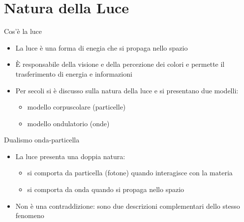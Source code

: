 \section{Natura della Luce}

\begin{frame}{Cos'è la luce}
    \begin{itemize}
        \item La luce è una forma di enegia che si propaga nello spazio
        \item È responsabile della visione e della percezione dei colori e permette il trasferimento di energia e informazioni
        \item Per secoli si è discusso sulla natura della luce e si presentano due modelli:
        \begin{itemize}
            \item modello corpuscolare (particelle)
            \item modello ondulatorio (onde)
        \end{itemize}
    \end{itemize}
\end{frame}

\newcommand{\currentlink}{} %


\begin{frame}{Dualismo onda-particella}
    \begin{itemize}
        \item La luce presenta una doppia natura:
        \begin{itemize}
            \item si comporta da particella (fotone) quando interagisce con la materia
            \item si comporta da onda quando si propaga nello spazio
        \end{itemize}
        \item Non è una contraddizione: sono due descrizioni complementari dello stesso fenomeno
    \end{itemize}
\end{frame}



